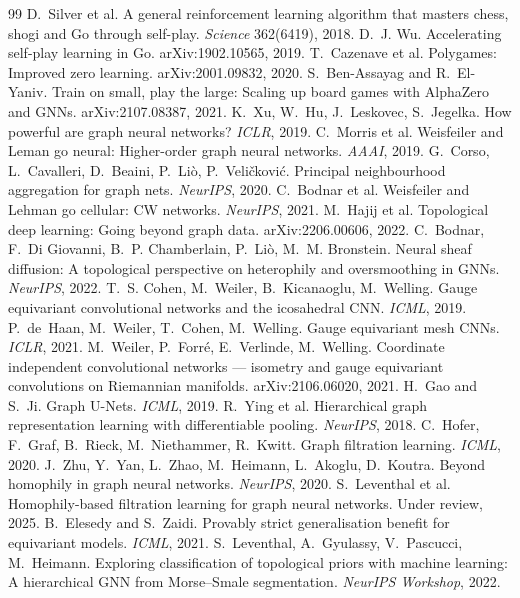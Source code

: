 \documentclass[11pt]{article}
\begin{document}
\begin{thebibliography}{99}\small
{} D.~Silver et al.
A general reinforcement learning algorithm that masters chess, shogi and
Go through self-play. \emph{Science} 362(6419), 2018.
 D.~J. Wu.
Accelerating self-play learning in Go. arXiv:1902.10565, 2019.
 T.~Cazenave et al.
Polygames: Improved zero learning. arXiv:2001.09832, 2020.
 S.~Ben-Assayag and R.~El-Yaniv.
Train on small, play the large: Scaling up board games with AlphaZero and
GNNs. arXiv:2107.08387, 2021.
 K.~Xu, W.~Hu, J.~Leskovec, S.~Jegelka.
How powerful are graph neural networks? \emph{ICLR}, 2019.
 C.~Morris et al.
Weisfeiler and Leman go neural: Higher-order graph neural networks.
\emph{AAAI}, 2019.
 G.~Corso, L.~Cavalleri, D.~Beaini, P.~Li\`o,
P.~Veli\v{c}kovi\'c. Principal neighbourhood aggregation for graph nets.
\emph{NeurIPS}, 2020.
 C.~Bodnar et al.
Weisfeiler and Lehman go cellular: CW networks. \emph{NeurIPS}, 2021.
 M.~Hajij et al.
Topological deep learning: Going beyond graph data. arXiv:2206.00606,
2022.
 C.~Bodnar, F.~Di Giovanni, B.~P. Chamberlain,
P.~Li\`o, M.~M. Bronstein. Neural sheaf diffusion: A topological
perspective on heterophily and oversmoothing in GNNs. \emph{NeurIPS},
2022.
 T.~S. Cohen, M.~Weiler, B.~Kicanaoglu,
M.~Welling. Gauge equivariant convolutional networks and the icosahedral
CNN. \emph{ICML}, 2019.
 P.~de~Haan, M.~Weiler, T.~Cohen, M.~Welling.
Gauge equivariant mesh CNNs. \emph{ICLR}, 2021.
 M.~Weiler, P.~Forr\'e, E.~Verlinde,
M.~Welling. Coordinate independent convolutional networks --- isometry
and gauge equivariant convolutions on Riemannian manifolds.
arXiv:2106.06020, 2021.
 H.~Gao and S.~Ji. Graph U-Nets. \emph{ICML}, 2019.
 R.~Ying et al.
Hierarchical graph representation learning with differentiable pooling.
\emph{NeurIPS}, 2018.
 C.~Hofer, F.~Graf, B.~Rieck, M.~Niethammer,
R.~Kwitt. Graph filtration learning. \emph{ICML}, 2020.
 J.~Zhu, Y.~Yan, L.~Zhao, M.~Heimann, L.~Akoglu,
D.~Koutra. Beyond homophily in graph neural networks. \emph{NeurIPS},
2020.
 S.~Leventhal et al. Homophily-based
filtration learning for graph neural networks. Under review, 2025.
 B.~Elesedy and S.~Zaidi.
Provably strict generalisation benefit for equivariant models.
\emph{ICML}, 2021.
 S.~Leventhal, A.~Gyulassy, V.~Pascucci,
M.~Heimann. Exploring classification of topological priors with machine
learning: A hierarchical GNN from Morse--Smale segmentation.
\emph{NeurIPS Workshop}, 2022.
\end{thebibliography}
\end{document}
